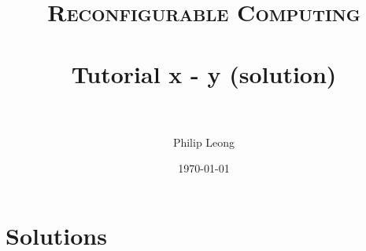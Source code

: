 \documentclass[paper=a4, fontsize=11pt]{scrartcl} %
\title{	
\normalfont \normalsize 
\textsc{Reconfigurable Computing} \\ [25pt] %
\horrule{0.5pt} \\[0.4cm] %
\huge Tutorial x - y (solution) \\ %
\horrule{2pt} \\[0.5cm] %
}
\author{Philip Leong} %
\date{\normalsize\today} %
\begin{document}
\maketitle %



\newpage
\section{Solutions}


{}

\end{document}
